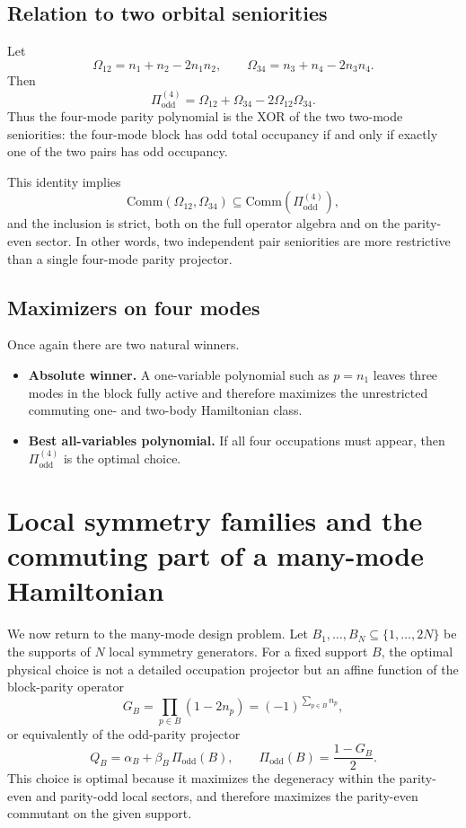 \documentclass[11pt]{article}
\newcommand{\odd}{\mathrm{odd}}
\newcommand{\Comm}{\mathrm{Comm}}
\theoremstyle{definition}
\theoremstyle{remark}
\begin{document}
\subsection{Relation to two orbital seniorities}
Let
\begin{equation}
  \Omega_{12}=n_1+n_2-2n_1n_2,
  \qquad
  \Omega_{34}=n_3+n_4-2n_3n_4.
\end{equation}
Then
\begin{equation}
  \Pi^{(4)}_{\odd} = \Omega_{12}+\Omega_{34}-2\Omega_{12}\Omega_{34}.
\end{equation}
Thus the four-mode parity polynomial is the XOR of the two two-mode seniorities: the four-mode block has odd total occupancy if and only if exactly one of the two pairs has odd occupancy.

This identity implies
\begin{equation}
  \Comm(\Omega_{12},\Omega_{34}) \subseteq \Comm(\Pi^{(4)}_{\odd}),
\end{equation}
and the inclusion is strict, both on the full operator algebra and on the parity-even sector. In other words, two independent pair seniorities are more restrictive than a single four-mode parity projector.

\subsection{Maximizers on four modes}
Once again there are two natural winners.
\begin{itemize}[leftmargin=2em]
  \item \textbf{Absolute winner.} A one-variable polynomial such as $p=n_1$ leaves three modes in the block fully active and therefore maximizes the unrestricted commuting one- and two-body Hamiltonian class.
  \item \textbf{Best all-variables polynomial.} If all four occupations must appear, then $\Pi^{(4)}_{\odd}$ is the optimal choice.
\end{itemize}

\section{Local symmetry families and the commuting part of a many-mode Hamiltonian}
We now return to the many-mode design problem. Let $B_1,\dots,B_N\subseteq\{1,\dots,2N\}$ be the supports of $N$ local symmetry generators. For a fixed support $B$, the optimal physical choice is not a detailed occupation projector but an affine function of the block-parity operator
\begin{equation}
  G_B = \prod_{p\in B}(1-2n_p) = (-1)^{\sum_{p\in B} n_p},
\end{equation}
or equivalently of the odd-parity projector
\begin{equation}
  Q_B=\alpha_B+\beta_B\,\Pi_{\odd}(B),
  \qquad
  \Pi_{\odd}(B)=\frac{1-G_B}{2}.
\end{equation}
This choice is optimal because it maximizes the degeneracy within the parity-even and parity-odd local sectors, and therefore maximizes the parity-even commutant on the given support.
\end{document}
